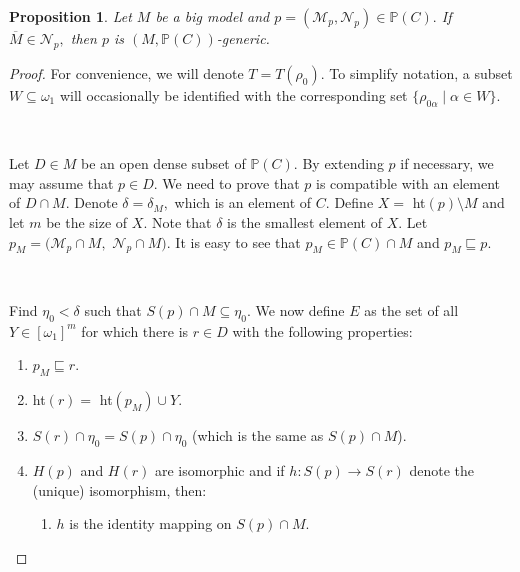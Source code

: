 \documentclass[10pt,a4paper]{amsart}
\newtheorem{proposition}{Proposition}
\begin{document}
\begin{proposition}
Let $M$ be a big model and $p=(\mathcal{M}_{p},\mathcal{N}_{p})\in
\mathbb{P}\left(  C\right)  .$ If $\overline{M}\in\mathcal{N}_{p},$ then $p$
is $(M,\mathbb{P}\left(  C\right)  )$-generic.
\end{proposition}

\begin{proof}
For convenience, we will denote $T=T\left(  \rho_{0}\right)  .$ To simplify
notation, a subset $W\subseteq\omega_{1}$ will occasionally be identified with
the corresponding set $\{\rho_{0\alpha}\mid\alpha\in W\}.$

\qquad\ \qquad\ \qquad\ \qquad\ \qquad\ \qquad\ 

Let $D\in M$ be an open dense subset of $\mathbb{P}\left(  C\right)  $. By
extending $p$ if necessary, we may assume that $p\in D.$ We need to prove that
$p$ is compatible with an element of $D\cap M.$ Denote $\delta=\delta_{M},$
which is an element of $C.$ Define $X=$ \textsf{ht}$\left(  p\right)
\setminus M$ and let $m$ be the size of $X.$ Note that $\delta$ is the
smallest element of $X.$ Let $p_{M}=(\mathcal{M}_{p}\cap M,$ $\mathcal{N}%
_{p}\cap M).$ It is easy to see that $p_{M}\in\mathbb{P}\left(  C\right)  \cap
M$ and $p_{M}\sqsubseteq p.$

\qquad\ \qquad\ \qquad\ \ \ 

Find $\eta_{0}<\delta$ such that $S\left(  p\right)  \cap M\subseteq\eta_{0}.$
We now define $E$ as the set of all $Y\in\left[  \omega_{1}\right]  ^{m}$ for
which there is $r\in D$ with the following properties:

\begin{enumerate}
\item $p_{M}\sqsubseteq r.$

\item \textsf{ht}$\left(  r\right)  =$ \textsf{ht}$\left(  p_{M}\right)  \cup
Y.$

\item $S\left(  r\right)  \cap\eta_{0}=S\left(  p\right)  \cap\eta_{0}$ (which
is the same as $S\left(  p\right)  \cap M$).

\item $H\left(  p\right)  $ and $H\left(  r\right)  $ are isomorphic and if
$h:S\left(  p\right)  \longrightarrow S\left(  r\right)  $ denote the (unique)
isomorphism, then:

\begin{enumerate}
\item $h$ is the identity mapping on $S\left(  p\right)  \cap M.$


\end{enumerate}
\end{enumerate}
\end{proof}
\end{document}
